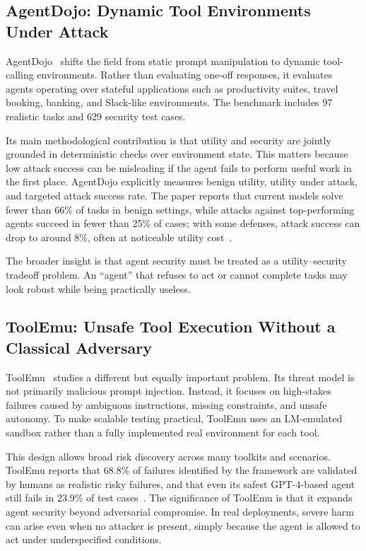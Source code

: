 \documentclass[conference]{IEEEtran}
\begin{document}
\subsection{AgentDojo: Dynamic Tool Environments Under Attack}

AgentDojo~\cite{debenedetti2024agentdojo} shifts the field from static prompt manipulation to dynamic tool-calling environments. Rather than evaluating one-off responses, it evaluates agents operating over stateful applications such as productivity suites, travel booking, banking, and Slack-like environments. The benchmark includes 97 realistic tasks and 629 security test cases.

Its main methodological contribution is that utility and security are jointly grounded in deterministic checks over environment state. This matters because low attack success can be misleading if the agent fails to perform useful work in the first place. AgentDojo explicitly measures benign utility, utility under attack, and targeted attack success rate. The paper reports that current models solve fewer than 66\% of tasks in benign settings, while attacks against top-performing agents succeed in fewer than 25\% of cases; with some defenses, attack success can drop to around 8\%, often at noticeable utility cost~\cite{debenedetti2024agentdojo}.

The broader insight is that agent security must be treated as a utility--security tradeoff problem. An ``agent'' that refuses to act or cannot complete tasks may look robust while being practically useless.

\subsection{ToolEmu: Unsafe Tool Execution Without a Classical Adversary}

ToolEmu~\cite{ruan2024toolemu} studies a different but equally important problem. Its threat model is not primarily malicious prompt injection. Instead, it focuses on high-stakes failures caused by ambiguous instructions, missing constraints, and unsafe autonomy. To make scalable testing practical, ToolEmu uses an LM-emulated sandbox rather than a fully implemented real environment for each tool.

This design allows broad risk discovery across many toolkits and scenarios. ToolEmu reports that 68.8\% of failures identified by the framework are validated by humans as realistic risky failures, and that even its safest GPT-4-based agent still fails in 23.9\% of test cases~\cite{ruan2024toolemu}. The significance of ToolEmu is that it expands agent security beyond adversarial compromise. In real deployments, severe harm can arise even when no attacker is present, simply because the agent is allowed to act under underspecified conditions.
\end{document}
